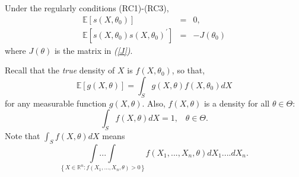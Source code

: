 \documentclass[notes=show]{beamer}
\begin{document}
\begin{frame}%


\begin{theorem}
Under the regularly conditions (RC1)-(RC3),%
\begin{eqnarray}
\mathbb{E}\left[ s\left( X,\theta _{0}\right) \right] &=&0,\   \label{2.14}
\\
\mathbb{E}\left[ s\left( X,\theta _{0}\right) s\left( X,\theta _{0}\right)
^{\prime }\right] &=&-J\left( \theta _{0}\right)
\end{eqnarray}%
where $J\left( \theta \right) $ is the matrix in \emph{(\ref{J})}.
\end{theorem}

\end{frame}%

\begin{frame}%


Recall that the \textit{true} density of $X$ is $f\left( X,\theta
_{0}\right) $, so that,%
\begin{equation}
\mathbb{E}\left[ g\left( X,\theta \right) \right] =\int_{S}g\left( X,\theta
\right) f\left( X,\theta _{0}\right) dX  \label{moment}
\end{equation}%
for any measurable function $g\left( X,\theta \right) $. Also, $f\left(
X,\theta \right) $ is a density for all $\theta \in \Theta $:%
\begin{equation}
\int_{S}f\left( X,\theta \right) dX=1,\;\;\;\theta \in \Theta .  \label{2.15}
\end{equation}%
Note that $\int_{S}f\left( X,\theta \right) dX$ means%
\begin{equation*}
\underset{\left\{ X\in 
\mathbb{R}
^{n}:f\left( X_{1},...,X_{n},\theta \right) >0\right\} }{\int ...\int }%
f\left( X_{1},...,X_{n},\theta \right) dX_{1}....dX_{n}.
\end{equation*}

\end{frame}%
\end{document}
